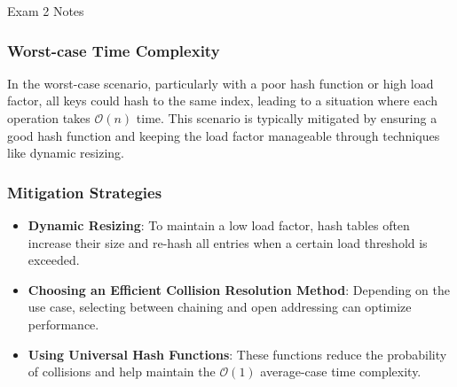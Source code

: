 \begin{examnotes}{Exam 2 Notes}
    \subsubsection*{Worst-case Time Complexity}
    
    In the worst-case scenario, particularly with a poor hash function or high load factor, all keys could hash to the same index, leading to a situation where each operation takes $\mathcal{O}(n)$ time. 
    This scenario is typically mitigated by ensuring a good hash function and keeping the load factor manageable through techniques like dynamic resizing.
    
    \subsubsection*{Mitigation Strategies}
    
    \begin{itemize}
        \item \textbf{Dynamic Resizing}: To maintain a low load factor, hash tables often increase their size and re-hash all entries when a certain load threshold is exceeded.
        \item \textbf{Choosing an Efficient Collision Resolution Method}: Depending on the use case, selecting between chaining and open addressing can optimize performance.
        \item \textbf{Using Universal Hash Functions}: These functions reduce the probability of collisions and help maintain the $\mathcal{O}(1)$ average-case time complexity.
    \end{itemize}
\end{examnotes}

